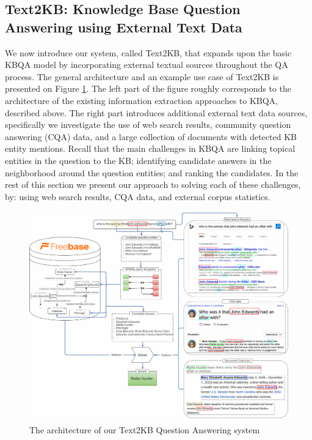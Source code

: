 \subsection{Text2KB: Knowledge Base Question Answering using External Text Data}
\label{subsec:text2kb}

We now introduce our system, called Text2KB, that expands upon the basic KBQA model by incorporating external textual sources throughout the QA process. The general architecture and an example use case of Text2KB is presented on Figure \ref{fig:text2kb:model}. 
The left part of the figure roughly corresponds to the architecture of the existing information extraction approaches to KBQA, described above.
The right part introduces additional external text data sources, specifically
we investigate the use of web search results, community question answering (CQA) data, and a large collection of documents with detected KB entity mentions.
Recall that the main challenges in KBQA are linking topical entities in the question to the KB; identifying candidate answers in the neighborhood around the question entities; and ranking the candidates. In the rest of this section we present our approach to solving each of these challenges, by: using web search results, CQA data, and external corpus statistics. 

\begin{figure}[h]
\centering
\includegraphics[width=1.0\textwidth]{img/Text2KB_model}
\caption{The architecture of our Text2KB Question Answering system}
\label{fig:text2kb:model}
\end{figure}

